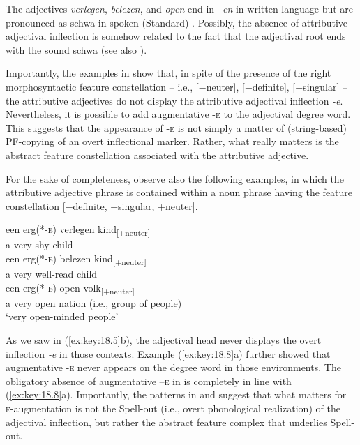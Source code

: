 \documentclass[output=paper]{langsci/langscibook}
\begin{document}
The adjectives \emph{verlegen}, \emph{belezen}, and \emph{open} end in
\emph{–en} in written language but are pronounced as schwa in spoken (Standard)
. Possibly, the absence of attributive adjectival inflection is
somehow related to the fact that the adjectival root ends with the sound schwa
(see also \citealt{Broekhuis2013}).

Importantly, the examples in  show that, in spite of the
presence of the right morphosyntactic feature constellation – i.e., [−neuter],
[−definite], [+singular] – the attributive adjectives do not display the
attributive adjectival inflection \emph{-e}. Nevertheless, it is possible to
add augmentative \textsc{-e} to the adjectival degree word. This suggests that
the appearance of \textsc{-e} is not simply a matter of (string-based)
\gls{PF}-copying of an overt inflectional marker. Rather, what really matters
is the abstract feature constellation associated with the attributive
adjective.

For the sake of completeness, observe also the following examples, in which the
attributive adjective phrase is contained within a noun phrase having the
feature constellation [−definite, +singular, +neuter].

\ea%
    \label{ex:key:18.23}
	\ea
	\gll een  erg(*-\textsc{e})    verlegen    kind\textsubscript{[+neuter]}\\
		 a        very            shy              child\\
	\ex
	\gll een  erg(*-\textsc{e})    belezen      kind\textsubscript{[+neuter]}\\
		a        very          well-read  child\\
	\ex
	\gll een  erg(*-\textsc{e})    open  volk\textsubscript{[+neuter]}\\
		a        very          open  nation (i.e., group of people)\\
	\glt \enquote*{very open-minded people}
	\z
\z

As we saw in (\ref{ex:key:18.5}b), the adjectival head never displays the overt
inflection \emph{‑e} in those contexts. Example (\ref{ex:key:18.8}a) further showed
that augmentative -\textsc{e} never appears on the degree word in those
environments. The obligatory absence of augmentative –\textsc{e} in
 is completely in line with (\ref{ex:key:18.8}a). Importantly, the
patterns in  and  suggest that what matters for
\textsc{e}-augmentation is not the Spell-out (i.e., overt phonological
realization) of the adjectival inflection, but rather the abstract feature
complex that underlies Spell-out.
\end{document}
